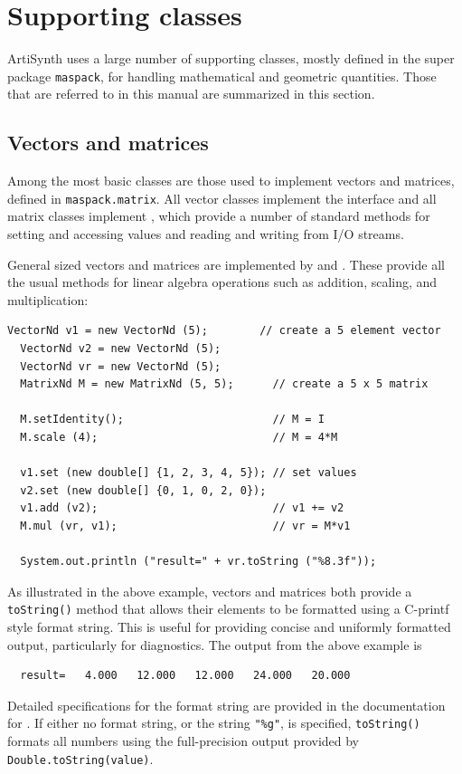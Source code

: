 \ifdefined\maindoc\else
\def\doctitle{Supporting classes}

\mainmatter
\fi

\chapter{Supporting classes}

ArtiSynth uses a large number of supporting classes, mostly defined in
the super package {\tt maspack}, for handling mathematical and
geometric quantities. Those that are referred to in this manual are
summarized in this section.

\section{Vectors and matrices}

Among the most basic classes are those used to implement vectors and
matrices, defined in {\tt maspack.matrix}. All vector classes implement
the interface  and all matrix
classes implement , which provide a
number of standard methods for setting and accessing values and
reading and writing from I/O streams. 

General sized vectors and matrices are implemented by
 and
. These provide all the usual
methods for linear algebra operations such as addition, scaling, and
multiplication:
%
\begin{lstlisting}[]
  VectorNd v1 = new VectorNd (5);        // create a 5 element vector
  VectorNd v2 = new VectorNd (5); 
  VectorNd vr = new VectorNd (5); 
  MatrixNd M = new MatrixNd (5, 5);      // create a 5 x 5 matrix

  M.setIdentity();                       // M = I
  M.scale (4);                           // M = 4*M

  v1.set (new double[] {1, 2, 3, 4, 5}); // set values
  v2.set (new double[] {0, 1, 0, 2, 0});
  v1.add (v2);                           // v1 += v2
  M.mul (vr, v1);                        // vr = M*v1

  System.out.println ("result=" + vr.toString ("%8.3f"));
\end{lstlisting}
%
As illustrated in the above example, vectors and matrices both provide
a {\tt toString()} method that allows their elements to be formatted
using a C-printf style format string. This is useful for providing
concise and uniformly formatted output, particularly for diagnostics.
The output from the above example is
%
\begin{verbatim}
  result=   4.000   12.000   12.000   24.000   20.000
\end{verbatim}
%
Detailed specifications for the format string are provided in the
documentation for .
If either no format string, or the string {\tt "\%g"}, is specified,
{\tt toString()} formats all numbers using the full-precision output
provided by {\tt Double.toString(value)}.

